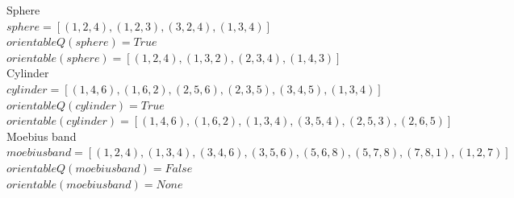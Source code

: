 \documentclass[12pt]{article}
\begin{document}
  Sphere \\
 \noindent $sphere = [(1, 2, 4), (1,2,3),(3,2,4),(1,3,4)] $\\
 $orientableQ(sphere) = True $ \\
 $orientable(sphere) = [(1, 2, 4), (1, 3, 2), (2, 3, 4), (1, 4, 3)] $\\
 
   Cylinder \\
 \noindent $cylinder = [(1,4,6),(1,6,2),(2,5,6),(2,3,5),(3,4,5),(1,3,4)] $\\
 $orientableQ(cylinder) = True $ \\
 $orientable(cylinder) = [(1, 4, 6), (1, 6, 2), (1, 3, 4), (3, 5, 4), (2, 5, 3), (2, 6, 5)] $\\
 
   Moebius band \\
 \noindent $moebiusband = [(1,2,4),(1,3,4),(3,4,6),(3,5,6),(5,6,8),(5,7,8),(7,8,1),(1,2,7)] $\\
 $orientableQ(moebiusband) = False $ \\
 $orientable(moebiusband) = None $\\
  
  
  





	
	
	
	
	
	
	
	
	

	
	
	
\end{document}
